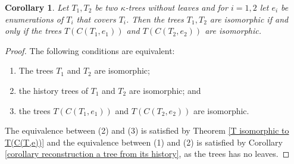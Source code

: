 \documentclass[11pt]{amsart}
\theoremstyle{plain}
\newtheorem{corollary}[theorem]{Corollary}
\theoremstyle{definition} %
\theoremstyle{remark}
\newcommand{\be}{\begin{enumerate}}
\newcommand{\ee}{\end{enumerate}}
\begin{document}
\begin{corollary}
Let $T_1,T_2$ be two $\kappa$-trees without leaves and for $i=1,2$ let $e_i$ be enumerations of $T_i$ that covers $T_i$. Then the trees $T_1,T_2$ are isomorphic if and only if the trees $T(C(T_1,e_1))$ and $T(C(T_2,e_2))$ are isomorphic.
\end{corollary}

\begin{proof}
The following conditions are equivalent:
\be
\item
The trees $T_1$ and $T_2$ are isomorphic;
\item
the history trees of $T_1$ and $T_2$  are isomorphic; and
\item
the trees $T(C(T_1,e_1))$ and $T(C(T_2,e_2))$ are isomorphic.
\ee
The equivalence between (2) and (3) is satisfied by Theorem \ref{T isomorphic to T(C(T,e))} and the equivalence between (1) and (2) is satisfied by Corollary \ref{corollary reconstruction a tree from its history}, as the trees has no leaves.
\end{proof}
\end{document}
